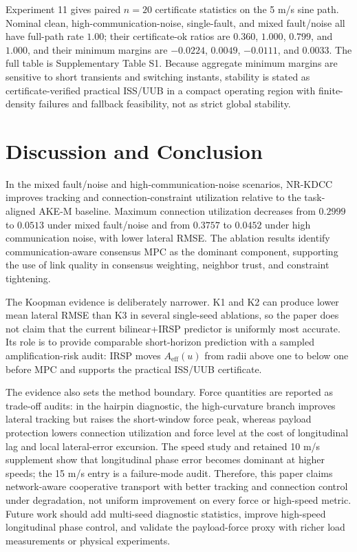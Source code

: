 \documentclass[twocolumn,3p,times,procedia]{elsarticle}
\newcommand{\AKE}{AKE-M}
\newcommand{\Method}{NR-KDCC}
\begin{document}
Experiment 11 gives paired $n=20$ certificate statistics on the 5 m/s sine path. Nominal clean, high-communication-noise, single-fault, and mixed fault/noise all have full-path rate $1.00$; their certificate-ok ratios are $0.360$, $1.000$, $0.799$, and $1.000$, and their minimum margins are $-0.0224$, $0.0049$, $-0.0111$, and $0.0033$. The full table is Supplementary Table S1. Because aggregate minimum margins are sensitive to short transients and switching instants, stability is stated as certificate-verified practical ISS/UUB in a compact operating region with finite-density failures and fallback feasibility, not as strict global stability.

\FloatBarrier

\section{Discussion and Conclusion}

In the mixed fault/noise and high-communication-noise scenarios, \Method{} improves tracking and connection-constraint utilization relative to the task-aligned \AKE{} baseline. Maximum connection utilization decreases from $0.2999$ to $0.0513$ under mixed fault/noise and from $0.3757$ to $0.0452$ under high communication noise, with lower lateral RMSE. The ablation results identify communication-aware consensus MPC as the dominant component, supporting the use of link quality in consensus weighting, neighbor trust, and constraint tightening.

The Koopman evidence is deliberately narrower. K1 and K2 can produce lower mean lateral RMSE than K3 in several single-seed ablations, so the paper does not claim that the current bilinear+IRSP predictor is uniformly most accurate. Its role is to provide comparable short-horizon prediction with a sampled amplification-risk audit: IRSP moves $A_{\mathrm{eff}}(u)$ from radii above one to below one before MPC and supports the practical ISS/UUB certificate.

The evidence also sets the method boundary. Force quantities are reported as trade-off audits: in the hairpin diagnostic, the high-curvature branch improves lateral tracking but raises the short-window force peak, whereas payload protection lowers connection utilization and force level at the cost of longitudinal lag and local lateral-error excursion. The speed study and retained 10 m/s supplement show that longitudinal phase error becomes dominant at higher speeds; the 15 m/s entry is a failure-mode audit. Therefore, this paper claims network-aware cooperative transport with better tracking and connection control under degradation, not uniform improvement on every force or high-speed metric. Future work should add multi-seed diagnostic statistics, improve high-speed longitudinal phase control, and validate the payload-force proxy with richer load measurements or physical experiments.

\FloatBarrier
\begingroup
\fontsize{7}{7}\selectfont
\setlength{\bibsep}{0pt plus 0.1ex}


\endgroup
\end{document}
